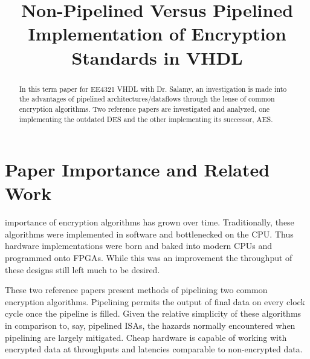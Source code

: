 \documentclass[journal,twocolumn]{IEEEtran}
\begin{document}
\title{Non-Pipelined Versus Pipelined Implementation of Encryption Standards in
VHDL} 
\author{
}

%
{}

\maketitle

\begin{abstract}
In this term paper for EE4321 VHDL with Dr. Salamy, an investigation is made 
into the advantages of pipelined architectures/dataflows through the lense of
common encryption algorithms. Two reference papers are investigated and 
analyzed, one implementing the outdated DES and the other implementing its
successor, AES.  
\end{abstract}

\tableofcontents

\section{Paper Importance and Related Work}
 importance of encryption algorithms has grown over 
time. Traditionally, these algorithms were implemented in software and 
bottlenecked on the CPU. Thus hardware implementations were born and baked 
into modern CPUs and programmed onto FPGAs. While this was an improvement 
the throughput of these designs still left much to be desired.

These two reference papers present methods of pipelining two common encryption
algorithms. Pipelining permits the output of final data on every clock cycle
once the pipeline is filled. Given the relative simplicity of these algorithms
in comparison to, say, pipelined ISAs, the hazards normally encountered when
pipelining are largely mitigated. Cheap hardware is capable of working with
encrypted data at throughputs and latencies comparable to non-encrypted data.
\end{document}
